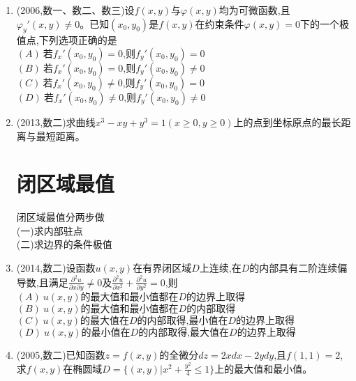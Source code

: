 \documentclass[12pt, a4paper, oneside, UTF8]{ctexbook}
\begin{document}
\begin{enumerate}[label=\arabic*.,start=11]
    \item (2006,数一、数二、数三)设$f(x,y)$与$\varphi(x,y)$均为可微函数,且$\varphi_y'(x,y)\neq 0$。已知$(x_0,y_0)$是$f(x,y)$在约束条件$\varphi(x,y)=0$下的一个极值点,下列选项正确的是 \\
    $(A)\ \text{若}f_x'(x_0,y_0)=0\text{,则}f_y'(x_0,y_0)=0$ \\
    $(B)\ \text{若}f_x'(x_0,y_0)=0\text{,则}f_y'(x_0,y_0)\neq 0$ \\
    $(C)\ \text{若}f_x'(x_0,y_0)\neq 0\text{,则}f_y'(x_0,y_0)=0$ \\
    $(D)\ \text{若}f_x'(x_0,y_0)\neq 0\text{,则}f_y'(x_0,y_0)\neq 0$
    
    \begin{solution}
    \newpage
    \end{solution}
    
    \item (2013,数二)求曲线$x^3-xy+y^3=1(x\geq 0,y\geq 0)$上的点到坐标原点的最长距离与最短距离。
    
    \begin{solution}
    \newpage
    \end{solution}

\section{闭区域最值}
\begin{remark}
    闭区域最值分两步做 \\
    (一)求内部驻点 \\
    (二)求边界的条件极值
\end{remark}
    \item (2014,数二)设函数$u(x,y)$在有界闭区域$D$上连续,在$D$的内部具有二阶连续偏导数,且满足$\frac{\partial^2 u}{\partial x\partial y}\neq 0$及$\frac{\partial^2 u}{\partial x^2}+\frac{\partial^2 u}{\partial y^2}=0$,则 \\
    $(A)\ u(x,y)\text{的最大值和最小值都在}D\text{的边界上取得}$ \\
    $(B)\ u(x,y)\text{的最大值和最小值都在}D\text{的内部取得}$ \\
    $(C)\ u(x,y)\text{的最大值在}D\text{的内部取得,最小值在}D\text{的边界上取得}$ \\
    $(D)\ u(x,y)\text{的最小值在}D\text{的内部取得,最大值在}D\text{的边界上取得}$

    
    \begin{solution}
    \newpage
    \end{solution}
    
    \item (2005,数二)已知函数$z=f(x,y)$的全微分$dz=2xdx-2ydy$,且$f(1,1)=2$,求$f(x,y)$在椭圆域$D=\{(x,y)|x^2+\frac{y^2}{4}\leq 1\}$上的最大值和最小值。
    
    \begin{solution}
    \newpage
    \end{solution}
\end{enumerate}

\ifx\allfiles\undefined
\end{document}
